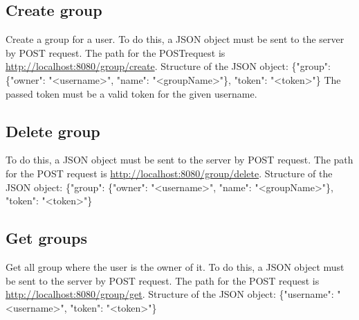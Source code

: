 \documentclass[12pt]{scrartcl}
\begin{document}
    \subsection{Create group}
        Create a group for a user.
        To do this, a JSON object must be sent to the server by POST request. The path for the POSTrequest is
        \url {http://localhost:8080/group/create}.
        Structure of the JSON object: \{"group": \{"owner": "<username>", "name": "<groupName>"\}, "token": "<token>"\}
        The passed token must be a valid token for the given username.

    \subsection{Delete group}
        To do this, a JSON object must be sent to the server by POST request. The path for the POST request is
        \url {http://localhost:8080/group/delete}.
        Structure of the JSON object: \{"group": \{"owner": "<username>", "name": "<groupName>"\}, "token": "<token>"\}

    \subsection{Get groups}
        Get all group where the user is the owner of it.
        To do this, a JSON object must be sent to the server by POST request. The path for the POST request is
        \url {http://localhost:8080/group/get}.
        Structure of the JSON object: \{"username": "<username>", "token": "<token>"\}
\end{document}

